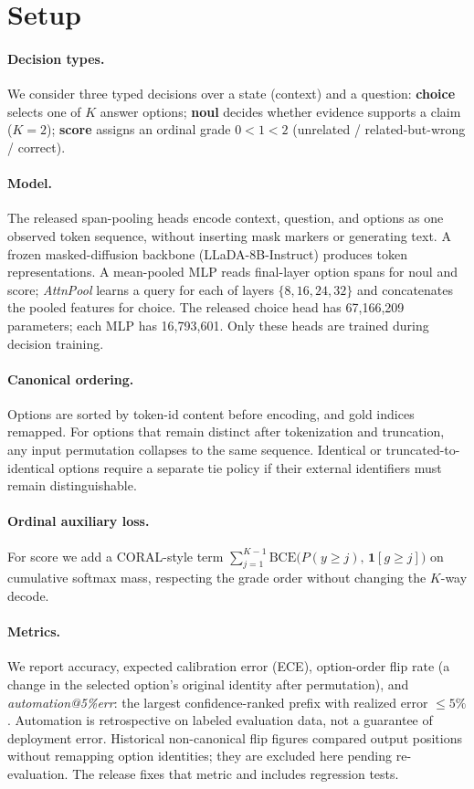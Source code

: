 \documentclass[11pt]{article}
\begin{document}
\section{Setup}
\paragraph{Decision types.}
We consider three typed decisions over a state (context) and a question:
\textbf{choice} selects one of $K$ answer options; \textbf{noul} decides
whether evidence supports a claim ($K{=}2$); \textbf{score} assigns an
ordinal grade $0 < 1 < 2$ (unrelated / related-but-wrong / correct).

\paragraph{Model.}
The released span-pooling heads encode context, question, and options as
one observed token sequence, without inserting mask markers or generating
text. A frozen masked-diffusion backbone (LLaDA-8B-Instruct) produces token
representations. A mean-pooled MLP reads final-layer option spans for
noul and score; \emph{AttnPool} learns a query for each of layers
$\{8,16,24,32\}$ and concatenates the pooled features for choice. The
released choice head has 67{,}166{,}209 parameters; each MLP has
16{,}793{,}601. Only these heads are trained during decision training.

\paragraph{Canonical ordering.}
Options are sorted by token-id content before encoding, and gold indices
remapped. For options that remain distinct after tokenization and
truncation, any input permutation collapses to the same sequence.
Identical or truncated-to-identical options require a separate tie policy
if their external identifiers must remain distinguishable.

\paragraph{Ordinal auxiliary loss.}
For score we add a CORAL-style term
$\sum_{j=1}^{K-1} \mathrm{BCE}\big(P(y \ge j),\,\mathbf{1}[g \ge j]\big)$
on cumulative softmax mass, respecting the grade order without changing the
$K$-way decode.

\paragraph{Metrics.}
We report accuracy, expected calibration error (ECE), option-order flip
rate (a change in the selected option's original identity after
permutation), and \emph{automation@5\%err}: the largest confidence-ranked
prefix with realized error $\le 5\%$. Automation is retrospective on
labeled evaluation data, not a guarantee of deployment error. Historical
non-canonical flip figures compared output positions without remapping
option identities; they are excluded here pending re-evaluation. The
release fixes that metric and includes regression tests.
\end{document}
